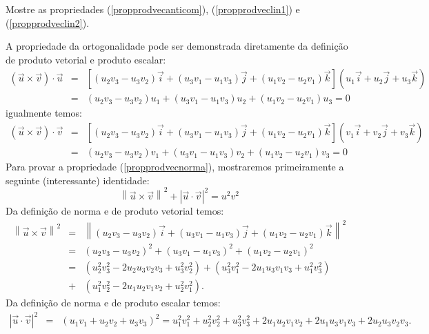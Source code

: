 \begin{exer} Mostre as propriedades (\ref{propprodvecanticom}), (\ref{propprodveclin1}) e (\ref{propprodveclin2}).  
\end{exer}
A propriedade da ortogonalidade pode ser demonstrada diretamente da definição de produto vetorial e produto escalar:
\begin{eqnarray*}\left(\vec{u}\times \vec{v}\right)\cdot \vec{u}&=&\left[\left(u_2v_3-u_3v_2\right)\vec{i}+\left(u_3v_1-u_1v_3\right)\vec{j}+\left(u_1v_2-u_2v_1\right)\vec{k}\right]\left(u_1\vec{i}+u_2\vec{j}+u_3\vec{k}\right)\\
&=&\left(u_2v_3-u_3v_2\right)u_1+\left(u_3v_1-u_1v_3\right)u_2+\left(u_1v_2-u_2v_1\right)u_3=0
\end{eqnarray*}
igualmente temos:
\begin{eqnarray*}\left(\vec{u}\times \vec{v}\right)\cdot \vec{v}&=&\left[\left(u_2v_3-u_3v_2\right)\vec{i}+\left(u_3v_1-u_1v_3\right)\vec{j}+\left(u_1v_2-u_2v_1\right)\vec{k}\right]\left(v_1\vec{i}+v_2\vec{j}+v_3\vec{k}\right)\\
&=&\left(u_2v_3-u_3v_2\right)v_1+\left(u_3v_1-u_1v_3\right)v_2+\left(u_1v_2-u_2v_1\right)v_3=0
\end{eqnarray*}
Para provar a propriedade (\ref{propprodvecnorma}), mostraremos primeiramente a seguinte (interessante) identidade:
\begin{equation}\label{identnorma}\left\|\vec{u}\times \vec{v}\right\|^2+\left|\vec{u}\cdot \vec{v}\right|^2=u^2v^2
\end{equation}
Da definição de norma e de produto vetorial temos:
\begin{eqnarray}\label{calcnormaprodvec}
\left\|\vec{u}\times \vec{v}\right\|^2&=&\left\|\left(u_2v_3-u_3v_2\right)\vec{i}+\left(u_3v_1-u_1v_3\right)\vec{j}+\left(u_1v_2-u_2v_1\right)\vec{k}\right\|^2\nonumber\\
&=&\left(u_2v_3-u_3v_2\right)^2+\left(u_3v_1-u_1v_3\right)^2+\left(u_1v_2-u_2v_1\right)^2\nonumber\\
&=&\left(u_2^2v_3^2-2u_2u_3v_2v_3+u_3^2v_2^2\right)+\left(u_3^2v_1^2-2u_1u_3v_1v_3+u_1^2v_3^2\right) \nonumber\\
&+&\left(u_1^2v_2^2-2u_1u_2v_1v_2+u_2^2v_1^2\right).
\end{eqnarray}
Da definição de norma e de produto escalar temos:
\begin{eqnarray*}
\left|\vec{u}\cdot \vec{v}\right|^2&=&\left(u_1v_1+u_2v_2+u_3v_3\right)^2=u_1^2v_1^2+u_2^2v_2^2+u_3^2v_3^2+2u_1u_2v_1v_2+2u_1u_3v_1v_3+2u_2u_3v_2v_3.
\end{eqnarray*}
